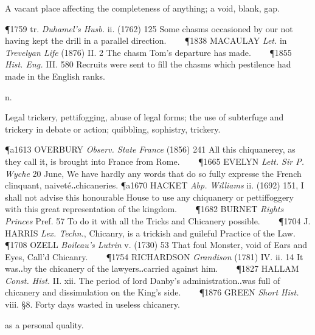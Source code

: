 \begin{description}[wide, labelwidth=!, labelindent=0pt]
\begin{myenumerate}
 A vacant place affecting the completeness of anything; a void, blank, gap.

\P 1759 tr. \textit{Duhamel's Husb.} ii. (1762) 125 Some chasms occasioned by our not having kept the drill in a parallel direction.    
\P 1838 MACAULAY  \textit{Let.} in \textit{Trevelyan Life} (1876) II. 2 The chasm Tom's departure has made.    
\P 1855 \textit{Hist. Eng.} III. 580 Recruits were sent to fill the chasms which pestilence had made in the English ranks.
\end{myenumerate}


 n.

\noindent {}

\vspace{-0.3cm}

\begin{myenumerate}

 Legal trickery, pettifogging, abuse of legal forms; the use of subterfuge and trickery in debate or action; quibbling, sophistry, trickery.

\P a1613 OVERBURY  \textit{Observ. State France} (1856) 241 All this chiquanerey, as they call it, is brought into France from Rome.    
\P 1665 EVELYN  \textit{Lett. Sir P. Wyche} 20 June, We have hardly any words that do so fully expresse the French clinquant, naiveté‥chicaneries.
\P a1670 HACKET  \textit{Abp. Williams} ii. (1692) 151, I shall not advise this honourable House to use any chiquanery or pettiffoggery with this great representation of the kingdom.    
\P 1682 BURNET  \textit{Rights Princes} Pref. 57 To do it with all the Tricks and Chicanery possible.    
\P 1704 J. HARRIS  \textit{Lex. Techn.}, Chicanry, is a trickish and guileful Practice of the Law.    
\P 1708 OZELL  \textit{Boileau's Lutrin} v. (1730) 53 That foul Monster, void of Ears and Eyes, Call'd Chicanry.    
\P 1754 RICHARDSON  \textit{Grandison} (1781) IV. ii. 14 It was‥by the chicanery of the lawyers‥carried against him.    
\P 1827 HALLAM  \textit{Const. Hist.} II. xii. The period of lord Danby's administration‥was full of chicanery and dissimulation on the King's side.    
\P 1876 GREEN  \textit{Short Hist.} viii. §8. Forty days wasted in useless chicanery.

 as a personal quality.


\end{myenumerate}
\end{description}
